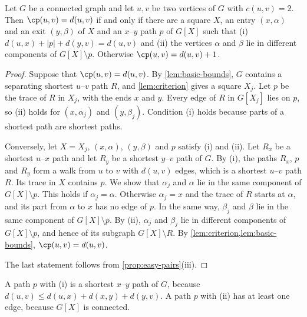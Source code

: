 \begin{theorem}
\label{thm:characterization}
Let $G$ be a connected graph and let $u, v$ be two vertices of $G$ with $c(u, v) = 2$.
Then $\cp(u, v) = d(u, v)$ if and only if there are a square $X$, an entry $(x, \alpha)$ and an exit $(y, \beta)$ of $X$ and an $x$--$y$ path $p$ of $G[X]$ such that
(i) $d(u, x) + |p| + d(y, v) = d(u, v)$ and
(ii) the vertices $\alpha$ and $\beta$ lie in different components of $G[X] \setminus p$.
Otherwise $\cp(u, v) = d(u, v) + 1$.
\end{theorem}

\begin{proof}
Suppose that $\cp(u, v) = d(u, v)$.
By \cref{lem:basic-bounds}, $G$ contains a separating shortest $u$--$v$ path $R$, and \cref{lem:criterion} gives a square $X_j$.
Let $p$ be the trace of $R$ in $X_j$, with the ends $x$ and $y$.
Every edge of $R$ in $G[X_j]$ lies on $p$, so (ii) holds for $(x, \alpha_j)$ and $(y, \beta_j)$.
Condition (i) holds because parts of a shortest path are shortest paths.

Conversely, let $X = X_j$, $(x, \alpha)$, $(y, \beta)$ and $p$ satisfy (i) and (ii).
Let $R_x$ be a shortest $u$--$x$ path and let $R_y$ be a shortest $y$--$v$ path of $G$.
By (i), the paths $R_x$, $p$ and $R_y$ form a walk from $u$ to $v$ with $d(u, v)$ edges, which is a shortest $u$--$v$ path $R$.
Its trace in $X$ contains $p$.
We show that $\alpha_j$ and $\alpha$ lie in the same component of $G[X] \setminus p$.
This holds if $\alpha_j = \alpha$.
Otherwise $\alpha_j = x$ and the trace of $R$ starts at $\alpha$, and its part from $\alpha$ to $x$ has no edge of $p$.
In the same way, $\beta_j$ and $\beta$ lie in the same component of $G[X] \setminus p$.
By (ii), $\alpha_j$ and $\beta_j$ lie in different components of $G[X] \setminus p$, and hence of its subgraph $G[X] \setminus R$.
By \cref{lem:criterion,lem:basic-bounds}, $\cp(u, v) = d(u, v)$.

The last statement follows from \cref{prop:easy-pairs}(iii).
\end{proof}

A path $p$ with (i) is a shortest $x$--$y$ path of $G$, because $d(u, v) \leq d(u, x) + d(x, y) + d(y, v)$.
A path $p$ with (ii) has at least one edge, because $G[X]$ is connected.

